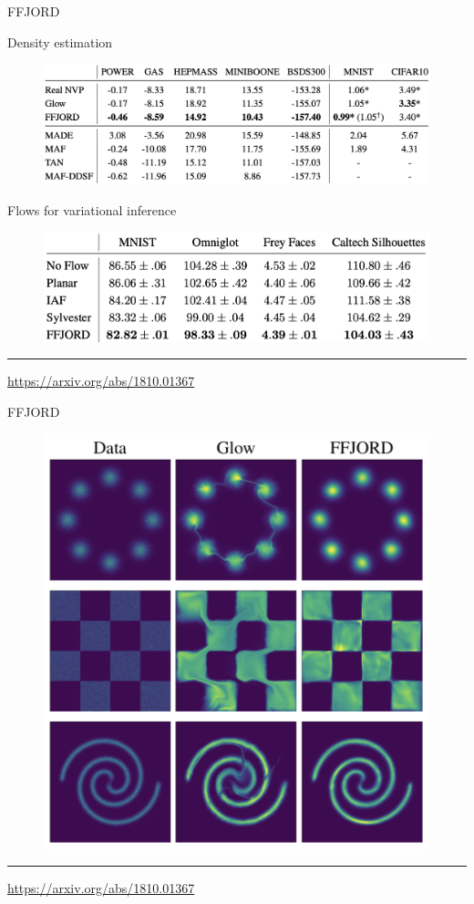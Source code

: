 \documentclass{beamer}
\begin{document}
\begin{frame}{FFJORD}
	\begin{block}{Density estimation}
		\begin{figure}
			\centering
			\includegraphics[width=0.8\linewidth]{figs/ffjord_results}
		\end{figure}
	\end{block}
	\begin{block}{Flows for variational inference}
		\begin{figure}
			\centering
			\includegraphics[width=0.8\linewidth]{figs/ffjord_vae}
		\end{figure}
	\end{block}
	\vfill
	\hrule\medskip
	{\scriptsize \href{https://arxiv.org/abs/1810.01367}{https://arxiv.org/abs/1810.01367}} 
\end{frame}
\begin{frame}{FFJORD}
\begin{figure}
    \centering
    \includegraphics[width=0.6\linewidth]{figs/ffjord.png}
\end{figure}
\vfill
\hrule\medskip
{\scriptsize \href{https://arxiv.org/abs/1810.01367}{https://arxiv.org/abs/1810.01367}} 
\end{frame}
\end{document}
